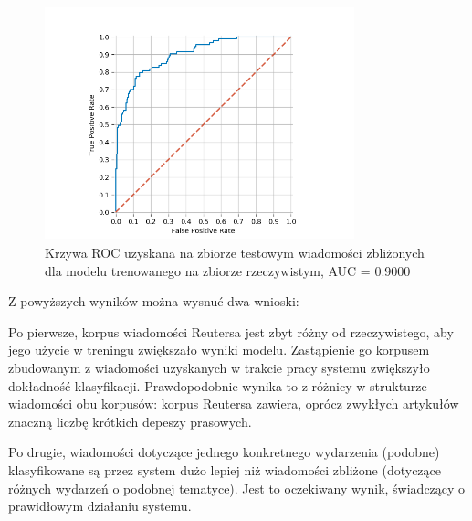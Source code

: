 \begin{figure}[H]
\centering
\includegraphics[width=0.8\textwidth]{./pict/dataset_z.png}
\caption{Krzywa ROC uzyskana na zbiorze testowym wiadomości zbliżonych dla modelu trenowanego na zbiorze rzeczywistym, AUC = 0.9000}
\label{fig:rocidentical}
\end{figure}

Z powyższych wyników można wysnuć dwa wnioski:

Po pierwsze, korpus wiadomości Reutersa jest zbyt różny od
rzeczywistego, aby jego użycie w treningu zwiększało wyniki
modelu. Zastąpienie go korpusem zbudowanym z wiadomości uzyskanych w
trakcie pracy systemu zwiększyło dokładność
klasyfikacji. Prawdopodobnie wynika to z różnicy w strukturze
wiadomości obu korpusów: korpus Reutersa zawiera, oprócz zwykłych
artykułów znaczną liczbę krótkich depeszy prasowych.

Po drugie, wiadomości dotyczące jednego konkretnego wydarzenia
(podobne) klasyfikowane są przez system dużo lepiej niż wiadomości
zbliżone (dotyczące różnych wydarzeń o podobnej tematyce). Jest to
oczekiwany wynik, świadczący o prawidłowym działaniu systemu.
